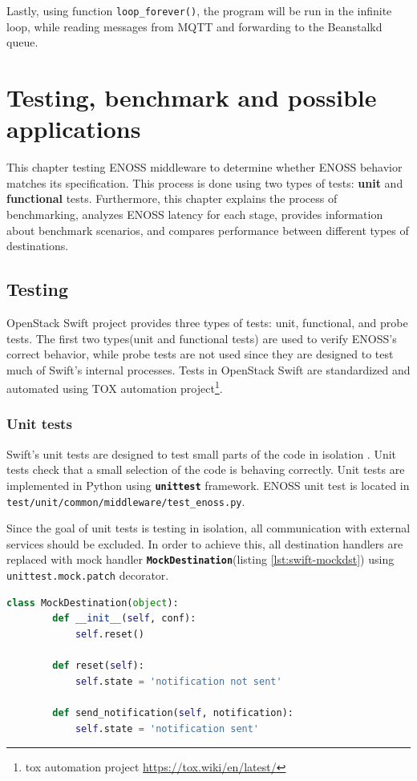     Lastly, using function \texttt{loop\_forever()}, the program will be run in the infinite loop, while reading messages from MQTT and forwarding to the Beanstalkd queue.


\chapter{Testing, benchmark and possible applications}\label{chap:testing}
    This chapter testing ENOSS middleware to determine whether ENOSS behavior matches its specification. This process is done using two types of tests: \textbf{unit} and \textbf{functional} tests. Furthermore, this chapter explains the process of benchmarking, analyzes ENOSS latency for each stage, provides information about benchmark scenarios, and compares performance between different types of destinations.

\section{Testing}
    OpenStack Swift project provides three types of tests: unit, functional, and probe tests. The first two types(unit and functional tests) are used to verify ENOSS's correct behavior, while probe tests are not used since they are designed to test much of Swift's internal processes.
    Tests in OpenStack Swift are standardized and automated using TOX automation project\footnote{tox automation project {\url{https://tox.wiki/en/latest/}}}.

    \subsection{Unit tests}
    Swift's unit tests are designed to test small parts of the code in isolation \cite{swiftContributing123}. Unit tests check that a small selection of the code is behaving correctly. Unit tests are implemented in Python using \textbf{\texttt{unittest}} framework. ENOSS unit test is located in \texttt{test/unit/common/middleware/test\_enoss.py}.

    Since the goal of unit tests is testing in isolation, all communication with external services should be excluded. In order to achieve this, all destination handlers are replaced with mock handler \textbf{\texttt{MockDestination}}(listing \ref{lst:swift-mockdst}) using \texttt{unittest.mock.patch} decorator.

    \begin{lstlisting}[language=Python, style=pythonStyle, caption=Mock class used to replace destination handlers in unit tests., label=lst:swift-mockdst]
    class MockDestination(object):
        def __init__(self, conf):
            self.reset()

        def reset(self):
            self.state = 'notification not sent'

        def send_notification(self, notification):
            self.state = 'notification sent'
    \end{lstlisting}

